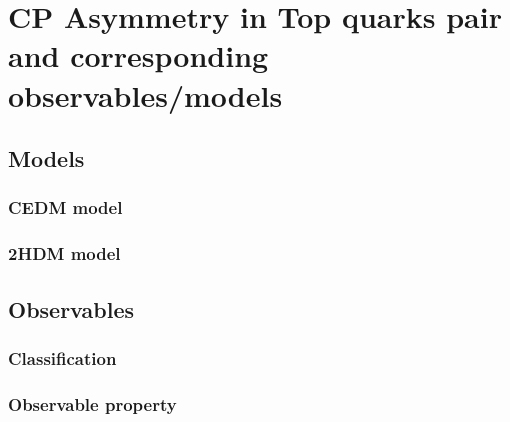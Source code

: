 

\section{CP Asymmetry in Top quarks pair and corresponding observables/models}
\label{sec:AcpModelObs}

	\subsection{Models}
	\label{ssec:AcpModel}

		\subsubsection{ CEDM model}
		\label{sssec:AcpModel_CEDM}

		\subsubsection{ 2HDM model}
		\label{sssec:AcpModel_2HDM}

	\subsection{Observables}
	\label{ssec:AcpObs}

		\subsubsection{Classification}
		\label{sssec:AcpObs_class}

		\subsubsection{Observable property}
		\label{sssec:AcpObs_property}


\FloatBarrier

